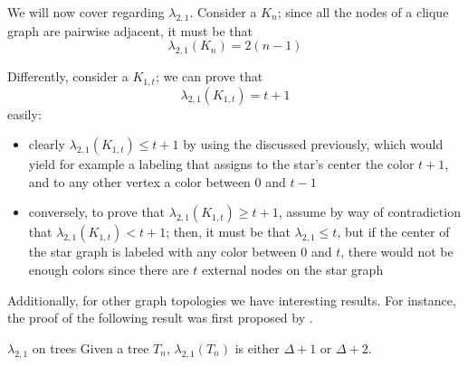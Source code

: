 \documentclass[a4paper, 12pt]{report}
\begin{document}
    We will now cover  regarding $\lambda_{2,1}$. Consider a  $K_n$; since all the nodes of a clique graph are pairwise adjacent, it must be that $$\lambda_{2, 1}(K_n) = 2(n - 1)$$

    Differently, consider a \href{https://en.wikipedia.org/wiki/Star_(graph_theory)}{} $K_{1, t}$; we can prove that $$\lambda_{2,1}(K_{1,t}) = t + 1$$ easily:

    \begin{itemize}
        \item clearly $\lambda_{2,1}(K_{1,t}) \le t + 1$ by using the  discussed previously, which would yield for example a labeling that assigns to the star's center the color $t + 1$, and to any other vertex a color between $0$ and $t - 1$
        \item conversely, to prove that $\lambda_{2,1}(K_{1,t}) \ge t + 1$, assume by way of contradiction that $\lambda_{2,1}(K_{1,t}) < t + 1$; then, it must be that $\lambda_{2,1} \le t$, but if the center of the star graph is labeled with any color between 0 and $t$, there would not be enough colors since there are $t$ external nodes on the star graph
    \end{itemize}
    
    Additionally, for other graph topologies we have interesting results. For instance, the proof of the following result was first proposed by \textcite{griggs}.

    \begin{framedthm}[label={lambda trees}]{$\lambda_{2,1}$ on trees}
        Given a tree $T_n$, $\lambda_{2,1}(T_n)$ is either $\Delta + 1$ or $\Delta + 2$.
    \end{framedthm}
\end{document}
